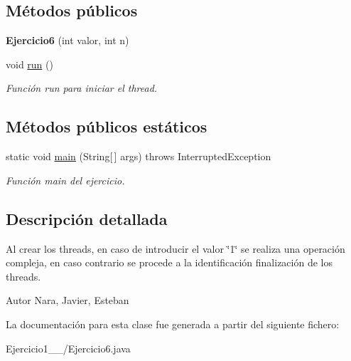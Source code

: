 \subsection*{Métodos públicos}
\begin{DoxyCompactItemize}
\item 
\hypertarget{class_ejercicio1__2__6_1_1_ejercicio6_a0f26beeead5d81eeccbcb16783ab28b6}{}{\bfseries Ejercicio6} (int valor, int n)\label{class_ejercicio1__2__6_1_1_ejercicio6_a0f26beeead5d81eeccbcb16783ab28b6}

\item 
\hypertarget{class_ejercicio1__2__6_1_1_ejercicio6_a0d280114351d6076e16146dff4c95f9e}{}void \hyperlink{class_ejercicio1__2__6_1_1_ejercicio6_a0d280114351d6076e16146dff4c95f9e}{run} ()\label{class_ejercicio1__2__6_1_1_ejercicio6_a0d280114351d6076e16146dff4c95f9e}

\begin{DoxyCompactList}\small\item\em Función run para iniciar el thread. \end{DoxyCompactList}\end{DoxyCompactItemize}
\subsection*{Métodos públicos estáticos}
\begin{DoxyCompactItemize}
\item 
\hypertarget{class_ejercicio1__2__6_1_1_ejercicio6_a88527c0dfa24f4f71dabd851b69b3f4a}{}static void \hyperlink{class_ejercicio1__2__6_1_1_ejercicio6_a88527c0dfa24f4f71dabd851b69b3f4a}{main} (String\mbox{[}$\,$\mbox{]} args)  throws Interrupted\+Exception      \label{class_ejercicio1__2__6_1_1_ejercicio6_a88527c0dfa24f4f71dabd851b69b3f4a}

\begin{DoxyCompactList}\small\item\em Función main del ejercicio. \end{DoxyCompactList}\end{DoxyCompactItemize}


\subsection{Descripción detallada}
Al crear los threads, en caso de introducir el valor \char`\"{}1\char`\"{} se realiza una operación compleja, en caso contrario se procede a la identificación finalización de los threads. 

\begin{DoxyAuthor}{Autor}
Nara, Javier, Esteban 
\end{DoxyAuthor}


La documentación para esta clase fue generada a partir del siguiente fichero\+:\begin{DoxyCompactItemize}
\item 
Ejercicio1\+\_\+\_/Ejercicio6.\+java\end{DoxyCompactItemize}
